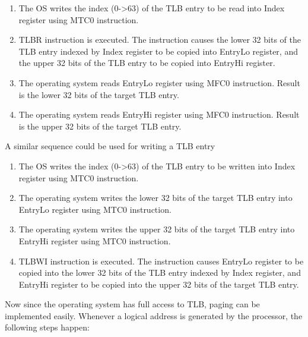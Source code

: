 \documentclass[]{scrartcl}
\begin{document}
\begin{enumerate}

\item The OS writes the index (0->63) of the TLB entry to be read into
      Index register using MTC0 instruction.

\item TLBR instruction is executed. The instruction causes the lower 32
      bits of the TLB entry indexed by Index register to be copied into 
      EntryLo register, and the upper 32 bits of the TLB entry to be copied
      into EntryHi register.

\item The operating system reads EntryLo register using MFC0 instruction.
      Result is the lower 32 bits of the target TLB entry. 

\item The operating system reads EntryHi register using MFC0 instruction.
      Result is the upper 32 bits of the target TLB entry.

\end{enumerate}

A similar sequence could be used for writing a TLB entry 

\begin{enumerate}

\item The OS writes the index (0->63) of the TLB entry to be written into
      Index register using MTC0 instruction.

\item The operating system writes the lower 32 bits of the target TLB
      entry into EntryLo register using MTC0 instruction.

\item The operating system writes the upper 32 bits of the target TLB
      entry into EntryHi register using MTC0 instruction.

\item TLBWI instruction is executed. The instruction causes EntryLo register
      to be copied into the lower 32 bits of the TLB entry indexed by Index register,
      and EntryHi register to be copied into the upper 32 bits of the target
      TLB entry.

\end{enumerate}

Now since the operating system has full access to TLB, paging can be
implemented easily. Whenever a logical address is generated by
the processor, the following steps happen:
\end{document}
